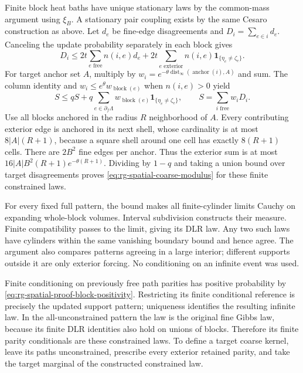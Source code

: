 Finite block heat baths have unique stationary laws by the common-mass
argument using \(\xi_B\). A stationary pair coupling exists by the same
Cesaro construction as above. Let \(d_e\) be fine-edge disagreements and
\(D_i=\sum_{e\in i}d_e\). Canceling the update probability separately in
each block gives
\begin{equation}
 D_i\le2t\sum_{e\text{ free}}n(i,e)d_e
      +2t\sum_{e\text{ exterior}}n(i,e)
                         \mathbf1_{\{\eta_e\ne\zeta_e\}}.
 \label{eq:rg-spatial-proof-block-hamming}
\end{equation}
For target anchor set \(A\), multiply by
\(w_i=e^{-\theta\operatorname{dist}_\infty(\operatorname{anchor}(i),A)}\)
and sum. The column identity and \(w_i\le e^\theta w_{\operatorname{block}(e)}\)
when \(n(i,e)>0\) yield
\begin{equation}
 S\le qS+q\sum_{e\in\partial_f\Lambda}w_{\operatorname{block}(e)}
                          \mathbf1_{\{\eta_e\ne\zeta_e\}},\qquad
 S=\sum_{i\text{ free}}w_iD_i.
 \label{eq:rg-spatial-proof-weighted-column}
\end{equation}
Use all blocks anchored in the radius \(R\) neighborhood of \(A\).
Every contributing exterior edge is anchored in its next shell, whose
cardinality is at most \(8|A|(R+1)\), because a square shell around one
cell has exactly \(8(R+1)\) cells. There are \(2B^2\) fine edges per
anchor. Thus the exterior sum is at most
\(16|A|B^2(R+1)e^{-\theta(R+1)}\). Dividing by \(1-q\) and taking a union
bound over target disagreements proves
\cref{eq:rg-spatial-coarse-modulus} for these finite constrained laws.

For every fixed full pattern, the bound makes all finite-cylinder limits
Cauchy on expanding whole-block volumes. Interval subdivision constructs
their measure. Finite compatibility passes to the limit, giving its DLR
law. Any two such laws have cylinders within the same vanishing boundary
bound and hence agree. The argument also compares patterns agreeing in a
large interior; different supports outside it are only exterior forcing.
No conditioning on an infinite event was used.

Finite conditioning on previously free path parities has positive
probability by \cref{eq:rg-spatial-proof-block-positivity}. Restricting its
finite conditional reference is precisely the updated support pattern;
uniqueness identifies the resulting infinite law. In the all-unconstrained
pattern the law is the original fine Gibbs law, because its finite DLR
identities also hold on unions of blocks. Therefore its finite parity
conditionals are these constrained laws. To define a target coarse kernel,
leave its paths unconstrained, prescribe every exterior retained parity,
and take the target marginal of the constructed constrained law.

